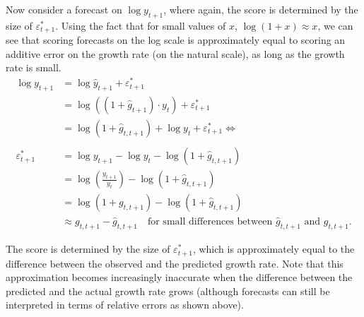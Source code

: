 \documentclass{article}
\begin{document}
Now consider a forecast on $\log y_{t+1}$, where again, the score is determined by the size of $\varepsilon^*_{t+1}$. Using the fact that for small values of $x$, $\log (1+ x) \approx x$, we can see that scoring forecasts on the log scale is approximately equal to scoring an additive error on the growth rate (on the natural scale), as long as the growth rate is small.
%
\begin{align}
\log y_{t+1}        &= \log \hat{y}_{t+1} + \varepsilon^*_{t+1} \\
                    &= \log ((1 + \hat{g}_{t+1}) \cdot y_{t}) + \varepsilon^*_{t+1} \\
                    &= \log (1 + \hat{g}_{t, t+1}) + \log y_t + \varepsilon^*_{t+1} \Leftrightarrow \\
\\
\varepsilon^*_{t+1}  &= \log y_{t+1} -  \log y_t - \log (1 + \hat{g}_{t, t+1}) \\    
                    &= \log (\frac{y_{t+1}}{y_t}) - \log (1 + \hat{g}_{t, t+1}) \\    
                    &= \log (1 + g_{t, t+1}) - \log (1 + \hat{g}_{t, t+1}) \\   
                    &\approx g_{t, t+1} - \hat{g}_{t, t+1} \quad \text{for small differences between } \hat{g}_{t, t+1} \text{ and } g_{t, t+1}. 
\end{align}

The score is determined by the size of $\varepsilon^*_{t+1}$, which is approximately equal to the difference between the observed and the predicted growth rate. Note that this approximation becomes increasingly inaccurate when the difference between the predicted and the actual growth rate grows (although forecasts can still be interpreted in terms of relative errors as shown above). %

\end{document}
